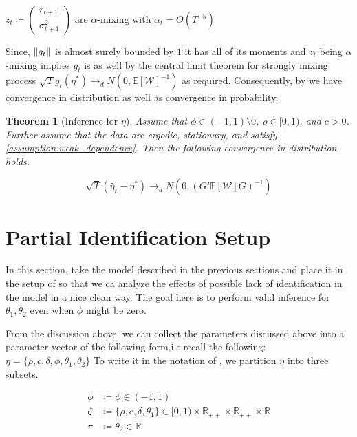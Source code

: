 \documentclass[11pt]{article}
\newtheorem{Theorem}{Theorem}[section]
\newcommand*{\R}{\mathbb{R}}
\newcommand*{\W}{\mathcal{W}}
\newcommand*{\E}{\mathbb{E}}
\newcommand*{\N}{N}
\newcommand*{\dto}{\ensuremath{\to_d}}
\newcommand*{\sampmom}{\ensuremath{\overline{g}_t}}
\DeclarePairedDelimiter\norm{\lVert}{\rVert}
\begin{document}
\begin{assump}
    \label{assumption:weak_dependence}
    $z_t \coloneqq \begin{pmatrix} r_{t+1} \\ \sigma^2_{t+1} \end{pmatrix}$ are $\alpha$-mixing with $\alpha_t =
       O\left(T^{-5}\right)$
\end{assump}

Since, $\norm*{g_t}$ is almost surely bounded by $1$ it has all of its moments and $z_t$ being $\alpha$-mixing
implies $g_t$ is as well by the central limit theorem for strongly mixing process 
$\sqrt{T} \sampmom(\eta^{*}) \dto \N\left(0, \E\left[\W\right]^{-1}\right)$ as required. 
Consequently, by \textcite[Theorem 3.2]{newey1994large} we have convergence in distribution as well as convergence
in probability.

\begin{Theorem}[Inference for $\eta$]
    Assume that $\phi  \in (-1,1) \setminus 0$, $\rho \in [0,1)$, and $c > 0$. 
    Further assume that the data are ergodic, stationary, and satisfy \cref{assumption:weak_dependence}.
    Then the following convergence in distribution holds.

    \begin{equation}
    \sqrt{T} (\widehat{\eta}_t - \eta^{*}) \dto \N\left(0, \left(G' \E[\W] G\right)^{-1}\right)
    \end{equation}
\end{Theorem}


\section{Partial Identification Setup}

In this section, take the model described in the previous sections and place it in the setup of
\textcite{andrewsGmm2014} so that we ca analyze the effects of possible lack of identification in the model in a
nice clean way.
The goal here is to perform valid inference for $\theta_1, \theta_2$ even when $\phi$ might be zero. 


From the discussion above, we can collect the parameters discussed above into a parameter vector of the following
form,i.e.\@ recall the following: $\eta = \lbrace \rho, c, \delta, \phi, \theta_1, \theta_2 \rbrace$
To write it in the notation of \textcite{andrewsGmm2014}, we partition $\eta$ into three subsets.

\begin{align}
    \phi &\coloneqq \phi  \in (-1, 1) \\ 
    \zeta &\coloneqq \lbrace \rho, c, \delta, \theta_1 \rbrace \in [0,1) \times \R_{++} \times \R_{++} \times
    \R  \\
    \pi &\coloneqq \theta_2 \in \R 
\end{align}
\end{document}
